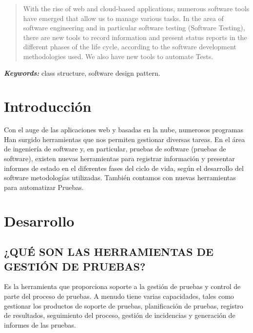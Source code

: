 \documentclass[12pt,letterpaper]{article}
\providecommand{\keywords}[1]
{
  \small	
  \textbf{\textit{Keywords: }} #1
}
\begin{document}
\begin{abstract}
    With the rise of web and cloud-based applications, numerous software 
    tools have emerged that allow us to manage various tasks. In the area 
    of software engineering and in particular software testing (Software Testing), 
    there are new tools to record information and present status reports in the 
    different phases of the life cycle, according to the software development 
    methodologies used. We also have new tools to automate Tests.
\end{abstract}
\keywords{class structure, software design pattern.}



\section{Introducción}

Con el auge de las aplicaciones web y basadas en la nube, numerosos programas
    Han surgido herramientas que nos permiten gestionar diversas tareas. En el área
    de ingeniería de software y, en particular, pruebas de software (pruebas de software),
    existen nuevas herramientas para registrar información y presentar informes de estado en el
    diferentes fases del ciclo de vida, según el desarrollo del software
    metodologías utilizadas. También contamos con nuevas herramientas para automatizar Pruebas.

\section{Desarrollo}

\subsection{¿QUÉ SON LAS HERRAMIENTAS DE GESTIÓN DE PRUEBAS?}

    
    Es la herramienta que proporciona soporte a la gestión
     de pruebas y control de parte del proceso de pruebas. 
     A menudo tiene varias capacidades, tales como gestionar 
     los productos de soporte de pruebas, planificación de pruebas, 
     registro de resultados, seguimiento del proceso, gestión de 
     incidencias y generación de informes de las pruebas.
\end{document}
